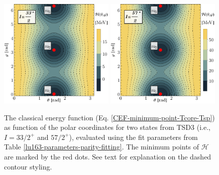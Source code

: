 \begin{figure}
    \centering
    \includegraphics[width=0.49\textwidth]{Chapters/Figures/parity-partners-plots/contour-tsd3-1.pdf}
    \includegraphics[width=0.49\textwidth]{Chapters/Figures/parity-partners-plots/contour-tsd3-2.pdf}
    \caption{The classical energy function (Eq. \ref{CEF-minimum-point-Tcore-Tsp}) as function of the polar coordinates for two states from TSD3 (i.e., $I=33/2^+$ and $57/2^+$), evaluated using the fit parameters from Table \ref{lu163-parameters-parity-fitting}. The minimum points of $\mathcal{H}$ are marked by the red dots. See text for explanation on the dashed contour styling.}
    \label{contour-cef-polar-tsd3}
\end{figure}
